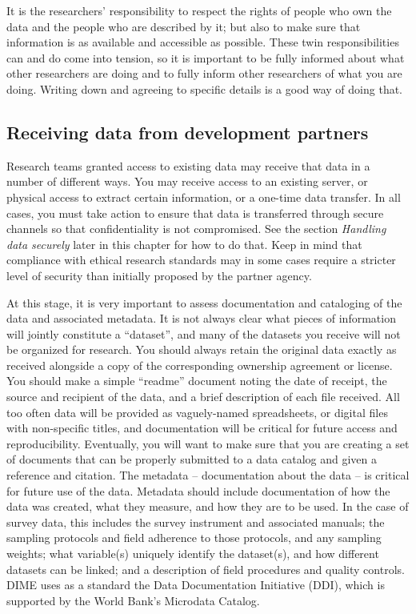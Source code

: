 It is the researchers' responsibility to respect the rights
of people who own the data and the people who are described by it;
but also to make sure that information is as available and accessible as possible.
These twin responsibilities can and do come into tension,
so it is important to be fully informed about what other researchers are doing
and to fully inform other researchers of what you are doing.
Writing down and agreeing to specific details is a good way of doing that.

\subsection{Receiving data from development partners}

Research teams granted access to existing data may receive that data in a number of different ways.
You may receive access to an existing server,
or physical access to extract certain information,
or a one-time data transfer.
In all cases, you must take action to ensure
that data is transferred through
secure channels so that confidentiality is not compromised.
See the section \textit{Handling data securely} later in this chapter for how to do that.
Keep in mind that compliance with ethical research standards may
in some cases require a stricter level of security than initially proposed by the partner agency.

At this stage, it is very important to assess
documentation and cataloging of the data and associated metadata.
It is not always clear what pieces of information will jointly constitute a ``dataset'',
and many of the datasets you receive will not be organized for research.
You should always retain the original data exactly as received
alongside a copy of the corresponding ownership agreement or license.
You should make a simple ``readme'' document noting the date of receipt,
the source and recipient of the data,
and a brief description of each file received.
All too often data will be provided as vaguely-named spreadsheets,
or digital files with non-specific titles,
and documentation will be critical for future access and reproducibility.
Eventually, you will want to make sure that you are creating a set of documents
that can be properly submitted to a data catalog and given a reference and citation.
The metadata -- documentation about the data -- is critical for future use of the data.
Metadata should include documentation of how the data was created,
what they measure, and how they are to be used.
In the case of survey data, this includes the survey instrument and associated manuals;
the sampling protocols and field adherence to those protocols, and any sampling weights;
what variable(s) uniquely identify the dataset(s), and how different datasets can be linked;
and a description of field procedures and quality controls.
DIME uses as a standard the Data Documentation Initiative (DDI), which is supported by the
World Bank's Microdata Catalog.

